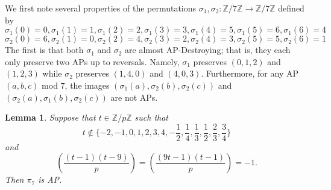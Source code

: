 \documentclass[12pt]{amsart}
\newtheorem{lemma}[thm]{Lemma}
\theoremstyle{definition}
\theoremstyle{remark}
\newcommand{\Z}{\mathbb Z}
\begin{document}
We first note several properties of the permutations $\sigma_1, \sigma_2: \Z/7\Z\to \Z/7\Z$ defined by 
\[\sigma_1(0)=0, \sigma_1(1)=1, \sigma_1(2)=2, \sigma_1(3)=3, \sigma_1(4)=5, \sigma_1(5)=6, \sigma_1(6)=4\]
\[\sigma_2(0)=6, \sigma_2(1)=0, \sigma_2(2)=4, \sigma_2(3)=2, \sigma_2(4)=3, \sigma_2(5)=5, \sigma_2(6)=1\]
The first is that both $\sigma_1$ and $\sigma_2$ are almost AP-Destroying; that is, they each only preserve two APs up to reversals. Namely, $\sigma_1$ preserves $(0, 1, 2)$ and $(1, 2, 3)$ while $\sigma_2$ preserves $(1, 4, 0)$ and $(4, 0, 3)$. Furthermore, for any AP $(a, b, c)$ mod $7$, the images $(\sigma_1(a), \sigma_2(b), \sigma_2(c))$ and $(\sigma_2(a), \sigma_1(b), \sigma_2(c))$ are not APs. 
\begin{lemma}
Suppose that $t\in \Z/p\Z$ such that
\[t\notin \{-2, -1, 0, 1, 2, 3, 4, -\frac{1}{2}, \frac{1}{4}, \frac{1}{3}, \frac{1}{2},\frac{2}{3}, \frac{3}{4}\}\]
and 
\[(\frac{(t-1)(t-9)}{p})=(\frac{(9t-1)(t-1)}{p})=-1.\]
Then $\pi_7$ is AP. 
\end{lemma}
\end{document}
